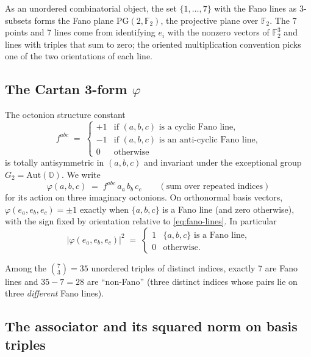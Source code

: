 \documentclass[11pt]{article}
\begin{document}
As an unordered combinatorial object, the set
$\{1, \ldots, 7\}$ with the Fano lines as 3-subsets forms the
Fano plane $\mathrm{PG}(2, \mathbb{F}_2)$, the projective plane
over $\mathbb{F}_2$.  The 7 points and 7 lines come from identifying
$e_i$ with the nonzero vectors of $\mathbb{F}_2^3$ and lines with
triples that sum to zero; the oriented multiplication
convention picks one of the two orientations of each line.

\subsection{The Cartan 3-form $\varphi$}
\label{sec:oct-cartan}

The octonion structure constant
\begin{equation}
  f^{abc} \;=\; \begin{cases}
      +1 & \text{if } (a, b, c) \text{ is a cyclic Fano line,} \\
      -1 & \text{if } (a, b, c) \text{ is an anti-cyclic Fano line,} \\
      0  & \text{otherwise}
  \end{cases}
\end{equation}
is totally antisymmetric in $(a, b, c)$ and invariant under the
exceptional group $G_2 = \mathrm{Aut}(\mathbb{O})$.  We write
\begin{equation}
  \varphi(a, b, c) \;=\; f^{abc}\,a_a\,b_b\,c_c
  \qquad (\text{sum over repeated indices})
  \label{eq:cartan-3-form}
\end{equation}
for its action on three imaginary octonions.  On orthonormal
basis vectors, $\varphi(e_a, e_b, e_c) = \pm 1$ exactly when
$\{a, b, c\}$ is a Fano line (and zero otherwise), with the sign
fixed by orientation relative to \eqref{eq:fano-lines}.  In
particular
\begin{equation}
  |\varphi(e_a, e_b, e_c)|^2 \;=\;
  \begin{cases} 1 & \{a,b,c\} \text{ is a Fano line,} \\
                0 & \text{otherwise.}
  \end{cases}
  \label{eq:phi-sq}
\end{equation}

Among the $\binom{7}{3} = 35$ unordered triples of distinct
indices, exactly 7 are Fano lines and
$35 - 7 = 28$ are ``non-Fano'' (three distinct indices whose
pairs lie on three \emph{different} Fano lines).

\subsection{The associator and its squared norm on basis triples}
\label{sec:oct-assoc}
\end{document}
